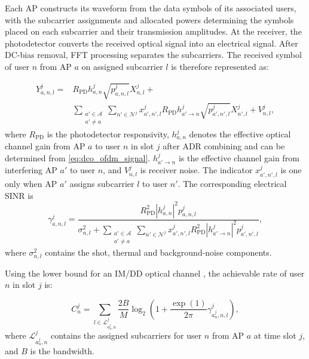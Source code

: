 \documentclass[journal]{IEEEtran}
\begin{document}
Each AP constructs its waveform from the data symbols of its associated users, with the subcarrier assignments and allocated powers determining the symbols placed on each
subcarrier and their transmission amplitudes. At the receiver,
the photodetector converts the received optical signal into an
electrical signal. After DC-bias removal, FFT processing separates
the subcarriers. The received symbol of user $n$ from AP $a$
on assigned subcarrier $l$ is therefore represented as:

\begin{align}
Y_{a,n,l}^{j}
= {}& R_{\mathrm{PD}}h_{a,n}^{j}
\sqrt{p_{a,n,l}^{j}}X_{n,l}^{j} +
\nonumber\\
&\sum_{\substack{a'\in\mathcal{A}\\a'\neq a}}
\sum_{n'\in\mathcal{N}^{j}}
x_{a',n',l}^{j}R_{\mathrm{PD}}h_{a'\rightarrow n}^{j}
\sqrt{p_{a',n',l}^{j}}X_{n',l}^{j}
+V_{n,l}^{j},
\label{eq:received_subcarrier}
\end{align}
where $R_{\mathrm{PD}}$ is the photodetector responsivity, $h_{a,n}^{j}$ denotes the effective optical channel gain
from AP $a$ to user $n$ in slot $j$ after ADR combining and can be determined from \eqref{eq:dco_ofdm_signal}.  $h_{a'\rightarrow n}^{j}$ is the effective channel gain from interfering AP $a'$ to user $n$, and $V_{n,l}^{j}$ is receiver noise. The indicator $x_{a',n',l}^{j}$ is one only when AP $a'$ assigns subcarrier $l$ to user $n'$. The corresponding electrical SINR is \cite{Sarbazi2024Receiver,11673253}
\begin{equation}
    \gamma_{a,n,l}^{j}
    =\frac{R_{\mathrm{PD}}^{2}|h_{a,n}^{j}|^{2}p_{a,n,l}^{j}}
    {\sigma_{n,l}^{2}
    +\displaystyle\sum_{\substack{a'\in\mathcal{A}\\a'\neq a}}
    \sum_{n'\in\mathcal{N}^{j}}
    x_{a',n',l}^{j}R_{\mathrm{PD}}^{2}|h_{a'\rightarrow n}^{j}|^{2}
    p_{a',n',l}^{j}},
    \label{eq:sinr}
\end{equation}
where $\sigma_{n,l}^{2}$ contains the shot, thermal and background-noise components.

Using the lower bound for an IM/DD optical channel \cite{11673253,11164782}, the achievable rate of user $n$ in slot $j$ is:

\begin{equation}
C_n^j
=
\sum_{l\in\mathcal{L}_{a_n^j,n}^{j}}
\frac{2B}{M}
\log_2\!\left(
1+\frac{\exp(1)}{2\pi}
\gamma_{a_n^j,n,l}^{j}
\right),
\label{eq:user_rate}
\end{equation}
where $\mathcal{L}_{a_n^j,n}^{j}$ contains the assigned subcarriers for user $n$ from AP $a$ at time slot $j$,
and $B$ is the bandwidth.
\end{document}
